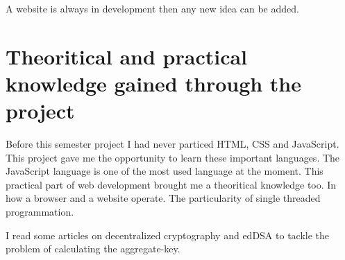 \documentclass[11pt, a4paper, twoside, openright, openany]{article} %
\begin{document}
A website is always in development then any new idea can be added.
\bigbreak

\section{Theoritical and practical knowledge gained through the project}
Before this semester project I had never particed HTML, CSS and JavaScript. This
project gave me the opportunity to learn these important languages. The JavaScript language is
one of the most used language at the moment.
\newline
This practical part of web development brought me a theoritical knowledge too.
In how a browser and a website operate. The particularity of single threaded programmation.
\bigbreak

I read some articles on decentralized cryptography and edDSA to tackle the problem
of calculating the aggregate-key.
\bigbreak

\clearpage
\begingroup
\let\cleardoublepage\clearpage


\endgroup
\end{document}
